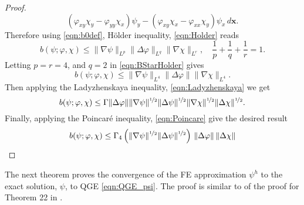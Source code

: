 \begin{proof}
\begin{equation}
      (\varphi_{xy} \chi_y - \varphi_{yy} \chi_x) \psi_y
      - (\varphi_{xy} \chi_x - \varphi_{xx} \chi_y) \psi_x \, d\mathbf{x}.
    \label{eqn:b0def}
  \end{equation}
  Therefore using \eqref{eqn:b0def}, H\"older inequality, \eqref{eqn:Holder} reads
  \begin{equation}
    b(\psi; \varphi, \chi) \le \|\nabla \psi\|_{L^p} \|\Delta \varphi\|_{L^q}
    \|\nabla \chi\|_{L^r},\quad \frac{1}{p} + \frac{1}{q} + \frac{1}{r} = 1.
    \label{eqn:BStarHolder}
  \end{equation}
  Letting $p = r = 4$, and $q = 2$ in \eqref{eqn:BStarHolder} gives
  \begin{equation*}
    b(\psi; \varphi, \chi) \le \|\nabla \psi\|_{L^4} \|\Delta \varphi\|
    \|\nabla \chi\|_{L^4}.
  \end{equation*}
  Then applying the Ladyzhenskaya inequality, \eqref{eqn:Ladyzhenskaya} we get
  \begin{equation*}
    b(\psi;\varphi,\chi) \le \Gamma \|\Delta \varphi\|
      \|\nabla \psi\|^{\nicefrac{1}{2}} \|\Delta \psi\|^{\nicefrac{1}{2}}
      \|\nabla \chi\|^{\nicefrac{1}{2}} \|\Delta \chi\|^{\nicefrac{1}{2}}.
  \end{equation*}
  Finally, applying the Poincar\'e inequality, \eqref{eqn:Poincare} give the desired result
  \begin{equation*}
    b(\psi;\varphi,\chi) \le \Gamma_4 \left(\|\nabla \psi\|^{\nicefrac{1}{2}}
      \|\Delta \psi\|^{\nicefrac{1}{2}}\right)\,
      \|\Delta \varphi\|\, \|\Delta \chi\|
  \end{equation*}
\end{proof}
The next theorem proves the convergence of the FE approximation $\psi^h$ to the
exact solution, $\psi$, to QGE \eqref{eqn:QGE_psi}. The proof is similar to of
the proof for Theorem 22 in \cite{Layton08}. \\
